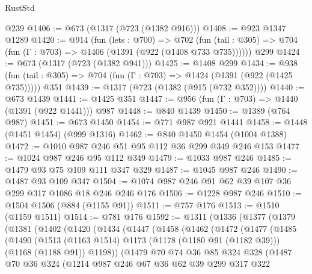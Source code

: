 \begin{lexlean}{RustStd}
\begin{coremodule}
    @239
@1406 := @673 (@1317 (@723 (@1382 @916)))
@1408 := @923 @1347 @1289
@1420 := @914
    (fun (lets : @700) =>
    @702 (fun (tail : @305) => @704 (fun (Γ : @703) => @1406 (@1391 (@922 (@1408 @733 @735))))))
    @299
@1424 := @673 (@1317 (@723 (@1382 @941)))
@1425 := @1408 @299
@1434 := @938 (fun (tail : @305) => @704 (fun (Γ : @703) => @1424 (@1391 (@922 (@1425 @735))))) @351
@1439 := @1317 (@723 (@1382 (@915 (@732 @352))))
@1440 := @673 @1439
@1441 := @1425 @351
@1447 := @956 (fun (Γ : @703) => @1440 (@1391 (@922 @1441))) @987
@1448 := @840 @1439
@1450 := @1389 (@764 @987)
@1451 := @673 @1450
@1454 := @771 @987 @921 @1441
@1458 := @1448 (@1451 @1454) (@999 @1316)
@1462 := @840 @1450 @1454 (@1004 @1388)
@1472 := @1010 @987 @246 @51 @95 @112 @36 @299 @349 @246 @153
@1477 := @1024 @987 @246 @95 @112 @349
@1479 := @1033 @987 @246
@1485 := @1479 @93 @75 @109 @111 @347 @329
@1487 := @1045 @987 @246
@1490 := @1487 @93 @109 @347
@1504 := @1074 @987 @246 @91 @62 @39 @107 @36 @299 @317 @1086 @18 @246 @246 @176
@1506 := @1228 @987 @246
@1510 := @1504 @1506 (@884 (@1155 @91))
@1511 := @757 @176
@1513 := @1510 (@1159 @1511)
@1514 := @781 @176
@1592 := @1311
    (@1336
      (@1377
        (@1379
          (@1381
            (@1402
              (@1420
                (@1434
                  (@1447
                    (@1458
                      (@1462
                        (@1472
                          (@1477
                            (@1485
                              (@1490
                                (@1513
                                  (@1163 @1514)
                                  @1173
                                  (@1178 (@1180 @91 (@1182 @39)))
                                  (@1168 (@1188 @91))
                                  @1198))
                              (@1479
                                @70
                                @74
                                @36
                                @85
                                @324
                                @328
                                (@1487
                                  @70
                                  @36
                                  @324
                                  (@1214
                                    @987
                                    @246
                                    @67
                                    @36
                                    @62
                                    @39
                                    @299
                                    @317
                                    @322

\end{coremodule}
\end{lexlean}
